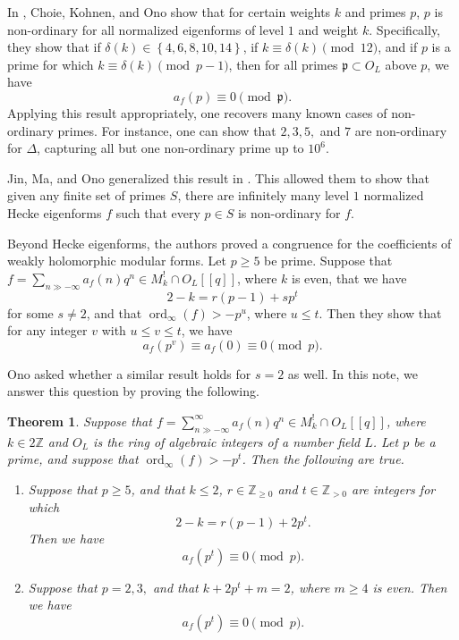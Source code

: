 \documentclass[11pt]{article}
\newcommand{\bbZ}{\mathbb{Z}}
\newtheorem{theorem}{Theorem}[section]
\theoremstyle{definition}
\numberwithin{equation}{subsection}
\newcommand{\set}[1]{\left\lbrace #1 \right\rbrace}
\DeclareMathOperator{\ord}{ord}
\begin{document}
In \cite{Choie2005linear}, Choie, Kohnen, and Ono show that for certain weights $k$ and primes $p$, $p$ is non-ordinary for all normalized eigenforms of level $1$ and weight $k$. Specifically, they show that if $\delta(k) \in \set{4,6,8,10,14}$, if $k \equiv \delta(k) \pmod{12}$, and if $p$ is a prime for which $k \equiv \delta(k) \pmod{p-1}$, then for all primes $\mathfrak{p} \subset O_L$ above $p$, we have
$$ a_f(p) \equiv 0 \pmod{\mathfrak{p}}. $$
Applying this result appropriately, one recovers many known cases of non-ordinary primes. For instance, one can show that $2,3,5,$ and $7$ are non-ordinary for $\Delta$, capturing all but one non-ordinary prime up to $10^6$. 

Jin, Ma, and Ono generalized this result in \cite{Seokho2016note}. This allowed them to show that given any finite set of primes $S$, there are infinitely many level $1$ normalized Hecke eigenforms $f$ such that every $p \in S$ is non-ordinary for $f$.

Beyond Hecke eigenforms, the authors proved a congruence for the coefficients of weakly holomorphic modular forms. Let $p \geq 5$ be prime. Suppose that $f = \sum_{ n \gg - \infty} a_f(n) q^n \in M_k^{!} \cap O_L[[q]]$, where $k$ is even, that we have 
$$ 2-k = r(p-1) + s p^t $$
for some $s \neq 2$, and that $\ord_{\infty}(f) > - p^u$, where $u \leq t$. Then they show that for any integer $v$ with $u \leq v \leq t$, we have 
$$ a_f(p^v) \equiv a_f(0) \equiv 0 \pmod p. $$




Ono \cite{Onoprivatecommunication} asked whether a similar result holds for $s = 2$ as well. In this note, we answer this question by proving the following.

\begin{theorem}\label{thm: Main theorem}
Suppose that $f = \sum_{n \gg - \infty}^{\infty} a_f(n) q^n \in M_k^{!} \cap O_L[[q]]$, where $k \in 2 \bbZ$ and $O_L$ is the ring of algebraic integers of a number field $L$. Let $p$ be a prime, and suppose that $\ord_{\infty}(f) > - p^t$. Then the following are true.

\begin{enumerate}
    \item Suppose that $p \geq 5$, and that $k \leq 2$, $r \in \bbZ_{\geq 0}$ and $t \in \bbZ_{>0}$ are integers for which
$$ 2-k = r(p-1) + 2 p^t. $$
Then we have
$$ a_f(p^t) \equiv 0 \pmod p. $$
\item Suppose that $p = 2,3,$ and that $k + 2 p^t + m = 2$, where $m \geq 4$ is even. Then we have
$$ a_f(p^t) \equiv 0 \pmod p. $$
\end{enumerate}

\end{theorem}
\end{document}
